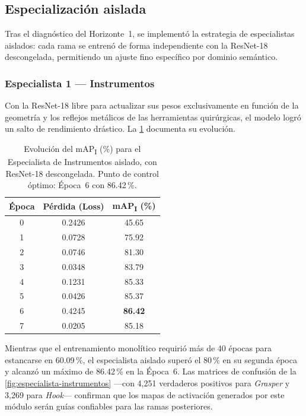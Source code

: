 \documentclass[11pt]{article}
\begin{document}
\subsection{Especialización aislada}
\label{sec:resultados-especialistas}

Tras el diagnóstico del Horizonte~1, se implementó la estrategia de especialistas aislados: cada rama se entrenó de forma independiente con la ResNet-18 descongelada, permitiendo un ajuste fino específico por dominio semántico.

\subsubsection*{Especialista 1 — Instrumentos}

Con la ResNet-18 libre para actualizar sus pesos exclusivamente en función de la geometría y los reflejos metálicos de las herramientas quirúrgicas, el modelo logró un salto de rendimiento drástico. La \cref{tab:especialista-instrumentos} documenta su evolución.

\begin{table}[htbp]
    \centering
    \caption{Evolución del mAP\textsubscript{I} (\%) para el Especialista de Instrumentos aislado, con ResNet-18 descongelada. Punto de control óptimo: Época~6 con 86.42\,\%.}
    \label{tab:especialista-instrumentos}
    \small
    \begin{tabular}{@{}ccc@{}}
        \toprule
        \textbf{Época} & \textbf{Pérdida (Loss)} & \textbf{mAP\textsubscript{I} (\%)} \\
        \midrule
        0 & 0.2426 & 45.65 \\
        1 & 0.0728 & 75.92 \\
        2 & 0.0746 & 81.30 \\
        3 & 0.0348 & 83.79 \\
        4 & 0.1231 & 85.33 \\
        5 & 0.0426 & 85.37 \\
        6 & 0.4245 & \textbf{86.42} \\
        7 & 0.0205 & 85.18 \\
        \bottomrule
    \end{tabular}
\end{table}

Mientras que el entrenamiento monolítico requirió más de 40 épocas para estancarse en 60.09\,\%, el especialista aislado superó el 80\,\% en su segunda época y alcanzó un máximo de 86.42\,\% en la Época~6. Las matrices de confusión de la \cref{fig:especialista-instrumentos} —con 4{,}251 verdaderos positivos para \emph{Grasper} y 3{,}269 para \emph{Hook}— confirman que los mapas de activación generados por este módulo serán guías confiables para las ramas posteriores.
\end{document}
